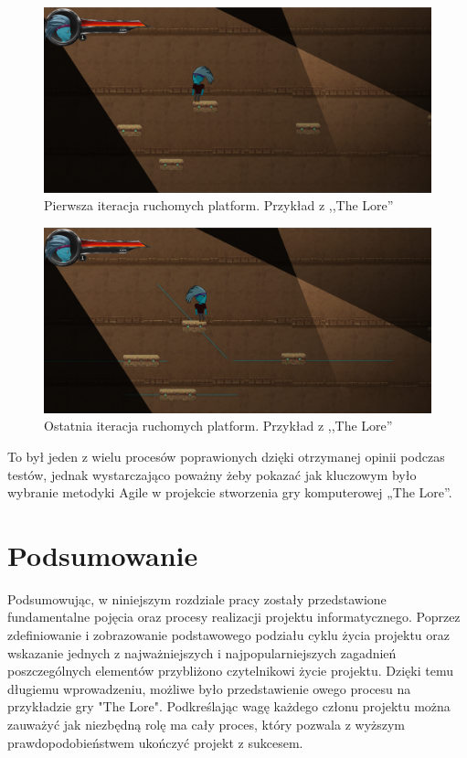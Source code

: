 \documentclass[oneside,polski,logo]{amuthesis}
\begin{document}
\begin{figure}[h]
	\centering
	\includegraphics[width=14cm]{images/hyps/platfBef.png}
	\caption{Pierwsza iteracja ruchomych platform. Przykład z ,,The Lore''}
\end{figure}

\begin{figure}[h!]
	\centering
	\includegraphics[width=14cm]{images/hyps/platfAfter.png}
	\caption{Ostatnia iteracja ruchomych platform. Przykład z ,,The Lore''}
\end{figure}

To był jeden z wielu procesów poprawionych dzięki otrzymanej opinii podczas testów, jednak wystarczająco poważny żeby pokazać jak kluczowym było wybranie metodyki Agile w projekcie stworzenia gry komputerowej „The Lore”.\\

\section{Podsumowanie}
Podsumowując, w niniejszym rozdziale pracy zostały przedstawione fundamentalne pojęcia oraz procesy realizacji projektu informatycznego. Poprzez zdefiniowanie i zobrazowanie podstawowego podziału cyklu życia projektu oraz wskazanie jednych z najważniejszych i najpopularniejszych zagadnień poszczególnych elementów przybliżono czytelnikowi życie projektu. Dzięki temu długiemu wprowadzeniu, możliwe było przedstawienie owego procesu na przykładzie gry "The Lore". Podkreślając wagę każdego członu projektu można zauważyć jak niezbędną rolę ma cały proces, który pozwala z wyższym prawdopodobieństwem ukończyć projekt z sukcesem. 
\end{document}
